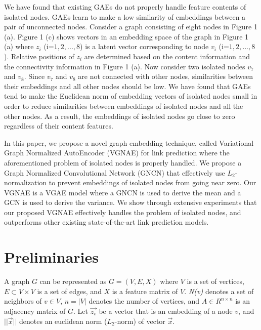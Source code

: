 \documentclass[sigconf]{acmart}
\begin{document}
We have found that existing GAEs do not properly handle feature contents of isolated nodes.
GAEs learn to make a low similarity of embeddings between a pair of unconnected nodes.
Consider a graph consisting of eight nodes in Figure 1 (a). 
Figure 1 (c) shows vectors in an embedding space of the graph in Figure 1 (a) where $z_i$ (i=$1,2,...,8$) is a latent vector corresponding to node $v_i$ (i=$1,2,...,8$).
Relative positions of $z_i$ are determined based on the content information and the connectivity information in Figure 1 (a).
Now consider two isolated nodes $v_7$ and $v_8$.
Since $v_7$ and $v_8$ are not connected with other nodes, similarities between their embeddings and all other nodes should be low.
We have found that GAEs tend to make the Euclidean norm of embedding vectors of isolated nodes small in order to reduce similarities between embeddings of isolated nodes and all the other nodes.
As a result, the embeddings of isolated nodes go close to zero regardless of their content features.

In this paper, we propose a novel graph embedding technique, called Variational Graph Normalized AutoEncoder (VGNAE) for link prediction where the aforementioned problem of isolated nodes is properly handled.
We propose a Graph Normalized Convolutional Network (GNCN) that effectively use $L_2$-normalization to prevent embeddings of isolated nodes from going near zero.
Our VGNAE is a VGAE model where a GNCN is used to derive the mean and a GCN is used to derive the variance.
We show through extensive experiments that our proposed VGNAE effectively handles the problem of isolated nodes, and outperforms other existing state-of-the-art link prediction models.

\section{Preliminaries}
A graph $G$ can be represented as $G=(V,E,X)$ where $V$ is a set of vertices, $E \subset V \times V$ is a set of edges, and $X$ is a feature matrix of $V$.
\emph{N(v)} denotes a set of neighbors of $v \in V$, $n = |V|$ denotes the number of vertices, and $A \in R^{n \times n}$ is an adjacency matrix of $G$.
Let \emph{$\vec{z_v}$} be a vector that is an embedding of a node $v$, and \emph{$||\vec{x}||$} denotes an euclidean norm ($L_2$-norm) of vector $\vec{x}$.
\end{document}
